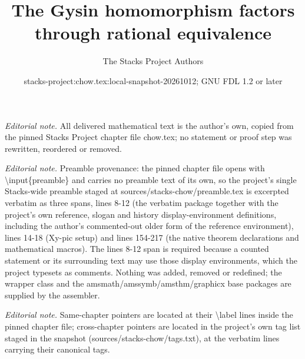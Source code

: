 \documentclass[10pt,a4paper]{amsart}
\title{The Gysin homomorphism factors through rational equivalence}
\author{The Stacks Project Authors}
\date{stacks-project:chow.tex:local-snapshot-20261012; GNU FDL 1.2 or later}
\theoremstyle{plain}
\theoremstyle{definition}
\theoremstyle{remark}
\numberwithin{equation}{subsection}
\begin{document}
\maketitle
\noindent\textit{Editorial note.} All delivered mathematical text is the author's own, copied from the pinned Stacks Project chapter file chow.tex; no statement or proof step was rewritten, reordered or removed.\par\medskip
\noindent\textit{Editorial note.} Preamble provenance: the pinned chapter file opens with \textbackslash{}input\{preamble\} and carries no preamble text of its own, so the project's single Stacks-wide preamble staged at sources/stacks-chow/preamble.tex is excerpted verbatim as three spans, lines 8-12 (the verbatim package together with the project's own reference, slogan and history display-environment definitions, including the author's commented-out older form of the reference environment), lines 14-18 (Xy-pic setup) and lines 154-217 (the native theorem declarations and mathematical macros). The lines 8-12 span is required because a counted statement or its surrounding text may use those display environments, which the project typesets as comments. Nothing was added, removed or redefined; the wrapper class and the amsmath/amssymb/amsthm/graphicx base packages are supplied by the assembler.\par\medskip
\noindent\textit{Editorial note.} Same-chapter pointers are located at their \textbackslash{}label lines inside the pinned chapter file; cross-chapter pointers are located in the project's own tag list staged in the snapshot (sources/stacks-chow/tags.txt), at the verbatim lines carrying their canonical tags.\par\medskip
\end{document}
